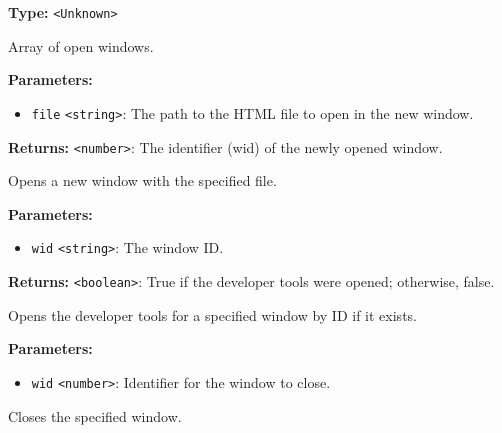 \documentclass[12pt,a4paper]{article}
\begin{document}
\noindent \textbf{Type:} \texttt{<Unknown>}

\noindent Array of open windows.

\vspace{5mm}
\noindent {}


\noindent \textbf{Parameters:}
\begin{itemize}
  \item \texttt{file} \texttt{<string>}: The path to the HTML file to open in the new window.
\end{itemize}

\noindent \textbf{Returns:} \texttt{<number>}: The identifier (wid) of the newly opened window.

\noindent Opens a new window with the specified file.

\vspace{5mm}
\noindent {}


\noindent \textbf{Parameters:}
\begin{itemize}
  \item \texttt{wid} \texttt{<string>}: The window ID.
\end{itemize}

\noindent \textbf{Returns:} \texttt{<boolean>}: True if the developer tools were opened; otherwise, false.

\noindent Opens the developer tools for a specified window by ID if it exists.

\vspace{5mm}
\noindent {}


\noindent \textbf{Parameters:}
\begin{itemize}
  \item \texttt{wid} \texttt{<number>}: Identifier for the window to close.
\end{itemize}

\noindent Closes the specified window.

\vspace{5mm}
\noindent {}
\end{document}
